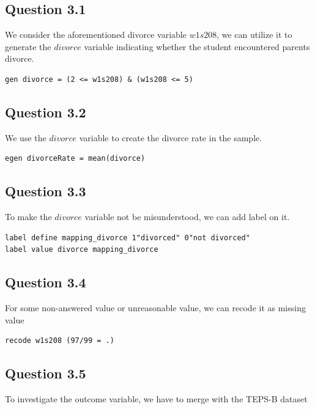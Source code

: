 \documentclass[11pt, letterpaper]{article}
\begin{document}
\subsection*{Question 3.1}

We consider the aforementioned divorce variable $\textit{w1s208}$, we can utilize it to generate the $\textit{divorce}$ variable indicating whether the student encountered parents divorce.

\begin{lstlisting}
gen divorce = (2 <= w1s208) & (w1s208 <= 5)
\end{lstlisting}


\subsection*{Question 3.2}

We use the $\textit{divorce}$ variable to create the divorce rate in the sample.

\begin{lstlisting}
egen divorceRate = mean(divorce)
\end{lstlisting}


\subsection*{Question 3.3}

To make the $\textit{divorce}$ variable not be misunderstood, we can add label on it.

\begin{lstlisting}
label define mapping_divorce 1"divorced" 0"not divorced"
label value divorce mapping_divorce
\end{lstlisting}


\subsection*{Question 3.4}

For some non-answered value or unreasonable value, we can recode it as missing value

\begin{lstlisting}
recode w1s208 (97/99 = .)
\end{lstlisting}


\subsection*{Question 3.5}

To investigate the outcome variable, we have to merge with the TEPS-B dataset
\end{document}
